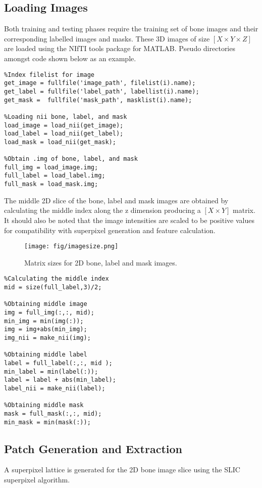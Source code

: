 \subsection{Loading Images} 
Both training and testing phases require the training set of bone images and their corresponding labelled images and masks. These 3D images of size $[X \times Y \times Z]$ are loaded using the NIfTI tools package \cite{ref:nifti_1} for MATLAB. Pseudo directories amongst code shown below as an example. 
\begin{lstlisting}
%Index filelist for image
get_image = fullfile('image_path', filelist(i).name);
get_label = fullfile('label_path', labellist(i).name);
get_mask =  fullfile('mask_path', masklist(i).name);
    
%Loading nii bone, label, and mask
load_image = load_nii(get_image);
load_label = load_nii(get_label);
load_mask = load_nii(get_mask); 

%Obtain .img of bone, label, and mask
full_img = load_image.img;
full_label = load_label.img;
full_mask = load_mask.img;
\end{lstlisting}

\bigskip
The middle 2D slice of the bone, label and mask images are obtained by calculating the middle index along the z dimension producing a $[X \times Y]$ matrix. It should also be noted that the image intensities are scaled to be positive values for compatibility with superpixel generation and feature calculation.

\begin{figure}[H]
\centering
\texttt{[image: fig/imagesize.png]}
\caption{Matrix sizes for 2D bone, label and mask images.}
\label{mat:image}
\end{figure}

\begin{lstlisting}
%Calculating the middle index
mid = size(full_label,3)/2;

%Obtaining middle image
img = full_img(:,:, mid);
min_img = min(img(:));
img = img+abs(min_img);
img_nii = make_nii(img);

%Obtaining middle label
label = full_label(:,:, mid );
min_label = min(label(:));
label = label + abs(min_label);
label_nii = make_nii(label);

%Obtaining middle mask
mask = full_mask(:,:, mid);
min_mask = min(mask(:));
\end{lstlisting}



\subsection{Patch Generation and Extraction}
A superpixel lattice is generated for the 2D bone image slice using the SLIC superpixel algorithm. 

